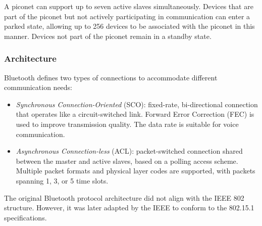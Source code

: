 A piconet can support up to seven active slaves simultaneously. 
Devices that are part of the piconet but not actively participating in communication can enter a parked state, allowing up to 256 devices to be associated with the piconet in this manner.
Devices not part of the piconet remain in a standby state.

\subsubsection{Architecture}
Bluetooth defines two types of connections to accommodate different communication needs:
\begin{itemize}
    \item \textit{Synchronous Connection-Oriented} (SCO): fixed-rate, bi-directional connection that operates like a circuit-switched link.
        Forward Error Correction (FEC) is used to improve transmission quality.
        The data rate is suitable for voice communication.
    \item \textit{Asynchronous Connection-less} (ACL): packet-switched connection shared between the master and active slaves, based on a polling access scheme.
        Multiple packet formats and physical layer codes are supported, with packets spanning 1, 3, or 5 time slots.
\end{itemize}
\noindent The original Bluetooth protocol architecture did not align with the IEEE 802 structure.
However, it was later adapted by the IEEE to conform to the 802.15.1 specifications. 

